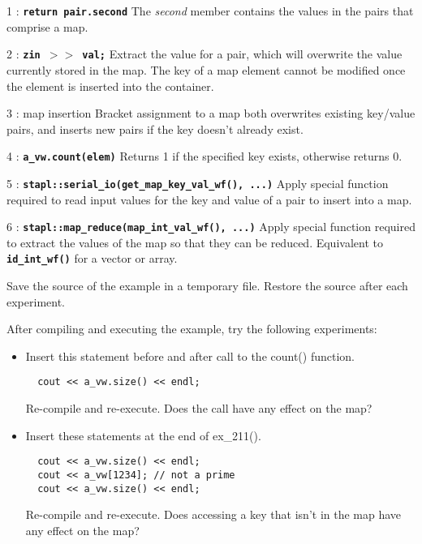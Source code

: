 \documentclass{report}
\begin{document}
\begin{hashitemize}
\item 1 : \texttt{{\bf return pair.second}}
\newline
The \emph{second} member contains the values in the pairs that
comprise a map.

\item 2 : \texttt{{\bf zin $>>$ val;}}
\newline
Extract the value for a pair, which will overwrite the value currently stored
in the map.  The key of a map element cannot be modified once the element is
inserted into the container.

\item 3 : map insertion
\newline
Bracket assignment to a map both overwrites existing key/value pairs,
and inserts new pairs if the key doesn't already exist.

\item 4 : \texttt{{\bf a\_vw.count(elem)}}
\newline
Returns 1 if the specified key exists, otherwise returns 0.

\item 5 : \texttt{{\bf stapl::serial\_io(get\_map\_key\_val\_wf(), ...)}}
\newline
Apply special function required to read input values for the key and value
of a pair to insert into a map.

\item 6 : \texttt{{\bf stapl::map\_reduce(map\_int\_val\_wf(), ...)}}
\newline
Apply special function required to extract the values of the map so that
they can be reduced.  Equivalent to
\texttt{{\bf id\_int\_wf()}} for a vector or array.

\end{hashitemize}

Save the source of the example in a temporary file.
Restore the source after each experiment.

After compiling and executing the example, try the following experiments:
\begin{itemize}
\item
Insert this statement before and after call to the count() function.
\begin{verbatim}
  cout << a_vw.size() << endl;
\end{verbatim}
Re-compile and re-execute.  Does the call have any effect on the map?
\item
Insert these statements at the end of ex\_211().
\begin{verbatim}
  cout << a_vw.size() << endl;
  cout << a_vw[1234]; // not a prime
  cout << a_vw.size() << endl;
\end{verbatim}
Re-compile and re-execute.  Does accessing a key that isn't in the map
have any effect on the map?
\end{itemize}
\end{document}
